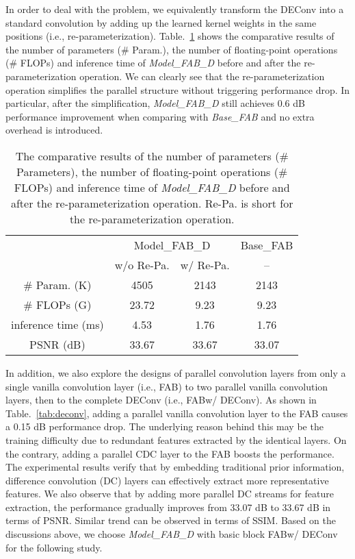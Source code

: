\documentclass[lettersize,journal]{IEEEtran}
\begin{document}
In order to deal with the problem, we equivalently transform the DEConv into a standard  convolution by adding up the learned kernel weights in the same positions (i.e., re-parameterization).
Table.~\ref{tab:re-param} shows the comparative results of the number of parameters (\# Param.), the number of floating-point operations (\# FLOPs) and inference time of \textit{Model\_FAB\_D} before and after the re-parameterization operation.
We can clearly see that the re-parameterization operation simplifies the parallel structure without triggering performance drop.
In particular, after the simplification, \textit{Model\_FAB\_D} still achieves 0.6 dB performance improvement when comparing with \textit{Base\_FAB} and no extra overhead is introduced. 

\begin{table}[!t]
	\footnotesize
	\centering
	\caption{The comparative results of the number of parameters (\# Parameters), the number of floating-point operations (\# FLOPs) and inference time of \textit{Model\_FAB\_D} before and after the re-parameterization operation. Re-Pa. is short for the re-parameterization operation.}
	\label{tab:re-param}	
	\begin{tabular}{c|cc|c}
		\toprule
		 & \multicolumn{2}{c|}{Model\_FAB\_D}& Base\_FAB\\
		 & w/o Re-Pa.  & w/ Re-Pa. & -- \\
		\midrule
		\midrule
		\# Param. (K) & 4505 & 2143 & 2143  \\
		\# FLOPs (G)  & 23.72 & 9.23 & 9.23 \\
		inference time (ms) &4.53  & 1.76 & 1.76 \\
		PSNR (dB) & 33.67 & 33.67 & 33.07\\
		\bottomrule
	\end{tabular}	
\end{table}

In addition, we also explore the designs of parallel convolution layers from only a single vanilla convolution layer (i.e., FAB) to two parallel vanilla convolution layers, then to the complete DEConv (i.e., FAB{\tiny w/ DEConv}).
As shown in Table.~\ref{tab:deconv}, adding a parallel vanilla convolution layer to the FAB causes a 0.15 dB performance drop.
The underlying reason behind this may be the training difficulty due to redundant features extracted by the identical layers.
On the contrary, adding a parallel CDC layer to the FAB boosts the performance.
The experimental results verify that by embedding traditional prior information, difference convolution (DC) layers can effectively extract more representative features. 
We also observe that by adding more parallel DC streams for feature extraction, the performance gradually improves from 33.07 dB to 33.67 dB in terms of PSNR. Similar trend can be observed in terms of SSIM.
Based on the discussions above, we choose \textit{Model\_FAB\_D} with basic block FAB{\tiny w/ DEConv} for the following study.
\end{document}
